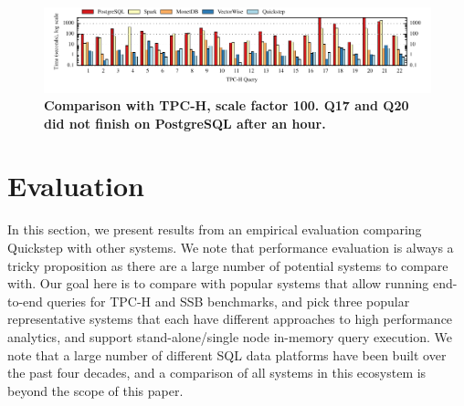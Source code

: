 
\begin{figure}[htb]
\center
\includegraphics[]{system/figures/all-tpch-sf100.pdf}
\caption{\textbf{Comparison with TPC-H, scale factor 100. Q17 and Q20 did not finish on PostgreSQL after an hour.}} %
\label{fig-tpch-sf100}
\end{figure}

\section{Evaluation} \label{evaluation}
In this section, we present results from an empirical evaluation comparing Quickstep with other systems. We note that performance evaluation is always a tricky proposition as there are a large number of potential systems to compare with. Our goal here is to compare with popular systems that allow running end-to-end queries for TPC-H and SSB benchmarks, and pick three popular representative systems that each have different approaches to high performance analytics, and support stand-alone/single node in-memory query execution. We note that a large number of different SQL data platforms have been built over the past four decades, and a comparison of all systems in this ecosystem is beyond the scope of this paper.


